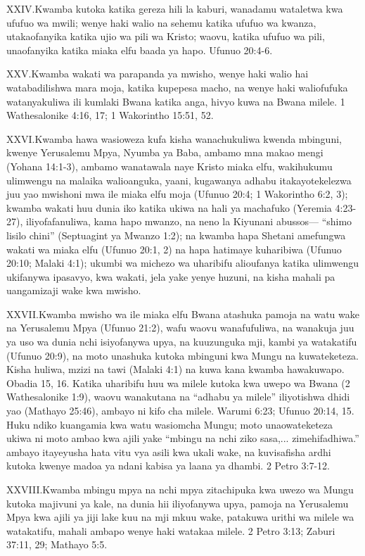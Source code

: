 \lettrine{XXIV.} Kwamba kutoka katika gereza hili la kaburi, wanadamu wataletwa kwa ufufuo wa mwili; wenye haki walio na sehemu katika ufufuo wa kwanza, utakaofanyika katika ujio wa pili wa Kristo; waovu, katika ufufuo wa pili, unaofanyika katika miaka elfu baada ya hapo. Ufunuo 20:4-6.


\lettrine{XXV.} Kwamba wakati wa parapanda ya mwisho, wenye haki walio hai watabadilishwa mara moja, katika kupepesa macho, na wenye haki waliofufuka watanyakuliwa ili kumlaki Bwana katika anga, hivyo kuwa na Bwana milele. 1 Wathesalonike 4:16, 17; 1 Wakorintho 15:51, 52.


\lettrine{XXVI.} Kwamba hawa wasioweza kufa kisha wanachukuliwa kwenda mbinguni, kwenye Yerusalemu Mpya, Nyumba ya Baba, ambamo mna makao mengi (Yohana 14:1-3), ambamo wanatawala naye Kristo miaka elfu, wakihukumu ulimwengu na malaika walioanguka, yaani, kugawanya adhabu itakayotekelezwa juu yao mwishoni mwa ile miaka elfu moja (Ufunuo 20:4; 1 Wakorintho 6:2, 3); kwamba wakati huu dunia iko katika ukiwa na hali ya machafuko (Yeremia 4:23-27), iliyofafanuliwa, kama hapo mwanzo, na neno la Kiyunani abussos— “shimo lisilo chini” (Septuagint ya Mwanzo 1:2); na kwamba hapa Shetani amefungwa wakati wa miaka elfu (Ufunuo 20:1, 2) na hapa hatimaye kuharibiwa (Ufunuo 20:10; Malaki 4:1); ukumbi wa michezo wa uharibifu alioufanya katika ulimwengu ukifanywa ipasavyo, kwa wakati, jela yake yenye huzuni, na kisha mahali pa uangamizaji wake kwa mwisho.


\lettrine{XXVII.} Kwamba mwisho wa ile miaka elfu Bwana atashuka pamoja na watu wake na Yerusalemu Mpya (Ufunuo 21:2), wafu waovu wanafufuliwa, na wanakuja juu ya uso wa dunia nchi isiyofanywa upya, na kuuzunguka mji, kambi ya watakatifu (Ufunuo 20:9), na moto unashuka kutoka mbinguni kwa Mungu na kuwateketeza. Kisha huliwa, mzizi na tawi (Malaki 4:1) na kuwa kana kwamba hawakuwapo. Obadia 15, 16. Katika uharibifu huu wa milele kutoka kwa uwepo wa Bwana (2 Wathesalonike 1:9), waovu wanakutana na “adhabu ya milele” iliyotishwa dhidi yao (Mathayo 25:46), ambayo ni kifo cha milele. Warumi 6:23; Ufunuo 20:14, 15. Huku ndiko kuangamia kwa watu wasiomcha Mungu; moto unaowateketeza ukiwa ni moto ambao kwa ajili yake “mbingu na nchi ziko sasa,... zimehifadhiwa.” ambayo itayeyusha hata vitu vya asili kwa ukali wake, na kuvisafisha ardhi kutoka kwenye madoa ya ndani kabisa ya laana ya dhambi. 2 Petro 3:7-12.


\lettrine{XXVIII.} Kwamba mbingu mpya na nchi mpya zitachipuka kwa uwezo wa Mungu kutoka majivuni ya kale, na dunia hii iliyofanywa upya, pamoja na Yerusalemu Mpya kwa ajili ya jiji lake kuu na mji mkuu wake, patakuwa urithi wa milele wa watakatifu, mahali ambapo wenye haki watakaa milele. 2 Petro 3:13; Zaburi 37:11, 29; Mathayo 5:5.



